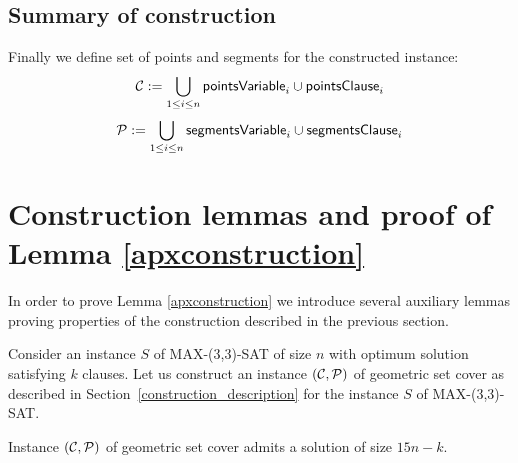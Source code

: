\subsection{Summary of construction}


Finally we define set of points and segments for the constructed instance:
$$\mathcal{C} := \bigcup_{1 \le i \le n} \mathsf{pointsVariable}_{i} \cup \mathsf{pointsClause}_i $$
$$\mathcal{P} := \bigcup_{1 \le i \le n} \mathsf{segmentsVariable}_{i} \cup \mathsf{segmentsClause}_i $$

\section{Construction lemmas and proof of Lemma \ref{apxconstruction}}

In order to prove Lemma \ref{apxconstruction} we introduce several
auxiliary lemmas proving properties of the construction
described in the previous section.

Consider an instance $S$ of MAX-(3,3)-SAT of size $n$
with optimum solution satisfying $k$ clauses.
Let us construct an instance $(\mathcal{C}, \mathcal{P})$ of geometric set cover
as described in Section~\ref{construction_description}
for the instance $S$ of MAX-(3,3)-SAT.

\begin{lemma}
	\label{construction_correctness}
	Instance $(\mathcal{C}, \mathcal{P})$ of geometric set cover
	admits a solution of size $15n - k$.
\end{lemma}

